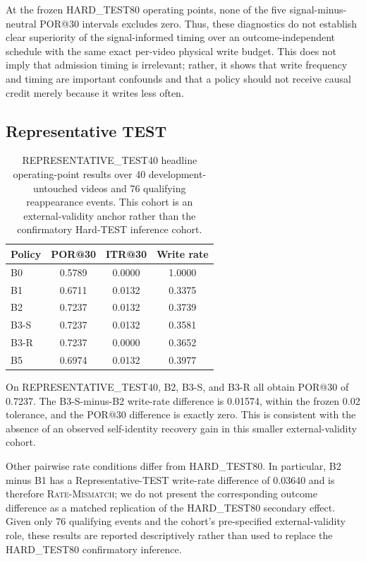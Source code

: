 \documentclass[10pt,twocolumn,letterpaper]{article}
\begin{document}
At the frozen HARD\_TEST80 operating points, none of the five
signal-minus-neutral POR@30 intervals excludes zero.  Thus, these diagnostics
do not establish clear superiority of the signal-informed timing over an
outcome-independent schedule with the same exact per-video physical write
budget.  This does not imply that admission timing is irrelevant; rather, it
shows that write frequency and timing are important confounds and that a
policy should not receive causal credit merely because it writes less often.

\subsection{Representative TEST}

\begin{table}[t]
\centering
\caption{REPRESENTATIVE\_TEST40 headline operating-point results over
40 development-untouched videos and 76 qualifying reappearance events.
This cohort is an external-validity anchor rather than the confirmatory
Hard-TEST inference cohort.}
\label{tab:representative-main}
\begin{tabular}{lccc}
\toprule
Policy & POR@30 & ITR@30 & Write rate \\
\midrule
B0   & 0.5789 & 0.0000 & 1.0000 \\
B1   & 0.6711 & 0.0132 & 0.3375 \\
B2   & 0.7237 & 0.0132 & 0.3739 \\
B3-S & 0.7237 & 0.0132 & 0.3581 \\
B3-R & 0.7237 & 0.0000 & 0.3652 \\
B5   & 0.6974 & 0.0132 & 0.3977 \\
\bottomrule
\end{tabular}
\end{table}

On REPRESENTATIVE\_TEST40, B2, B3-S, and B3-R all obtain POR@30 of
0.7237.  The B3-S-minus-B2 write-rate difference is 0.01574, within the
frozen 0.02 tolerance, and the POR@30 difference is exactly zero.  This is
consistent with the absence of an observed self-identity recovery gain in
this smaller external-validity cohort.

Other pairwise rate conditions differ from HARD\_TEST80.  In particular,
B2 minus B1 has a Representative-TEST write-rate difference of 0.03640 and
is therefore \textsc{Rate-Mismatch}; we do not present the corresponding
outcome difference as a matched replication of the HARD\_TEST80 secondary
effect.  Given only 76 qualifying events and the cohort's pre-specified
external-validity role, these results are reported descriptively rather than
used to replace the HARD\_TEST80 confirmatory inference.
\end{document}
